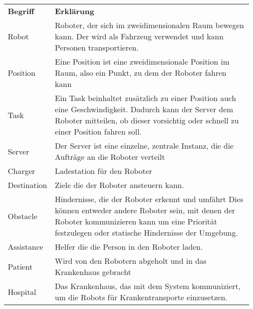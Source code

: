 	\begin{tabular}{ l p{10cm} }
		\textbf{Begriff} & \textbf{Erklärung}\\
		Robot & Roboter, der sich im zweidimensionalen Raum bewegen kann. Der wird
		als Fahrzeug verwendet und kann Personen transportieren.\\
		Position & Eine Position ist eine zweidimensionale Position im Raum,
		also ein Punkt, zu dem der Roboter fahren kann\\
		Task & Ein Task beinhaltet zusätzlich zu einer Position auch eine
		Geschwindigkeit. Dadurch kann der Server dem Roboter mitteilen, ob
		dieser vorsichtig oder schnell zu einer Position fahren
		soll.\\
		Server & Der Server ist eine einzelne, zentrale Instanz, die die Aufträge
		an die Roboter verteilt\\
		Charger & Ladestation für den Roboter\\
		Destination & Ziele die der Roboter ansteuern kann.\\
		Obstacle & Hindernisse, die der Roboter erkennt und umfährt Dies können
		entweder andere Roboter sein, mit denen der Roboter kommunizieren kann
		um eine Priorität festzulegen oder statische Hindernisse der
		Umgebung.\\
		Assistance & Helfer die die Person in den Roboter laden.\\
		Patient & Wird von den Robotern abgeholt und in das Krankenhaus gebracht\\
		Hospital & Das Krankenhaus, das mit dem System kommuniziert, um die Robots für Krankentransporte einzusetzen.
	\end{tabular}
